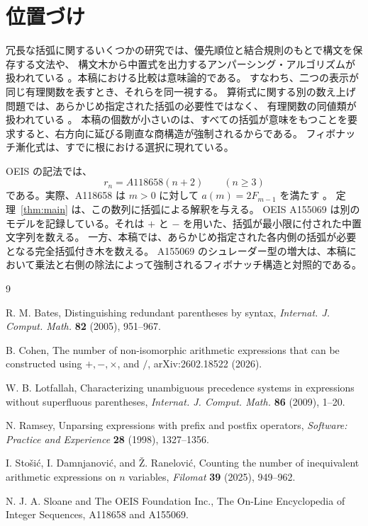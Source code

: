 \documentclass[11pt]{ltjsarticle}
\begin{document}
\section*{位置づけ}

冗長な括弧に関するいくつかの研究では、優先順位と結合規則のもとで構文を保存する文法や、
構文木から中置式を出力するアンパーシング・アルゴリズムが扱われている
\cite{Ramsey,Bates,Lotfallah}。本稿における比較は意味論的である。
すなわち、二つの表示が同じ有理関数を表すとき、それらを同一視する。
算術式に関する別の数え上げ問題では、あらかじめ指定された括弧の必要性ではなく、
有理関数の同値類が扱われている \cite{StosicDamnjanovicRandelovic,Cohen}。
本稿の個数が小さいのは、すべての括弧が意味をもつことを要求すると、右方向に延びる剛直な商構造が強制されるからである。
フィボナッチ漸化式は、すでに根における選択に現れている。

OEIS の記法では、
\[
 r_n=A118658(n+2)\qquad(n\ge3)
\]
である。実際、A118658 は $m>0$ に対して $a(m)=2F_{m-1}$ を満たす \cite{OEIS}。
定理~\ref{thm:main} は、この数列に括弧による解釈を与える。
OEIS A155069 は別のモデルを記録している。それは $+$ と $-$ を用いた、括弧が最小限に付された中置文字列を数える。
一方、本稿では、あらかじめ指定された各内側の括弧が必要となる完全括弧付き木を数える。
A155069 のシュレーダー型の増大は、本稿において乗法と右側の除法によって強制されるフィボナッチ構造と対照的である。

\begin{thebibliography}{9}
\footnotesize
\setlength{\itemsep}{0pt}

R. M. Bates,
Distinguishing redundant parentheses by syntax,
\emph{Internat. J. Comput. Math.} \textbf{82} (2005), 951--967.

B. Cohen,
The number of non-isomorphic arithmetic expressions that can be constructed
using $+,-,\times$, and $/$,
arXiv:2602.18522 (2026).

W. B. Lotfallah,
Characterizing unambiguous precedence systems in expressions without
superfluous parentheses,
\emph{Internat. J. Comput. Math.} \textbf{86} (2009), 1--20.

N. Ramsey,
Unparsing expressions with prefix and postfix operators,
\emph{Software: Practice and Experience} \textbf{28} (1998), 1327--1356.

I. Sto\v{s}i\'c, I. Damnjanovi\'c, and \v{Z}. Ran{\dj}elovi\'c,
Counting the number of inequivalent arithmetic expressions on $n$ variables,
\emph{Filomat} \textbf{39} (2025), 949--962.

N. J. A. Sloane and The OEIS Foundation Inc.,
The On-Line Encyclopedia of Integer Sequences, A118658 and A155069.

\end{thebibliography}
\end{document}
